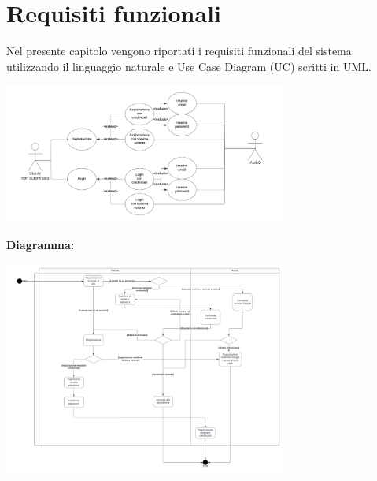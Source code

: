 \section{Requisiti funzionali}
\label{secD2:RequisitiFunzionali}

Nel presente capitolo vengono riportati i requisiti funzionali del sistema utilizzando il linguaggio naturale e Use Case Diagram (UC) scritti in UML.

\begin{listaPersonale}[UC]{}


    \begin{center}
        \includegraphics[width=0.7\textwidth]{img/Diagrammi/UseCases/AccessoRegistrazione.png}
    \end{center}

    \textbf{Diagramma:}
    \begin{center}
        \includegraphics[width=0.7\textwidth]{img/Diagrammi/DS/DS_AccessoRegistrazione.png}
    \end{center}


    \newpage



\end{listaPersonale}
